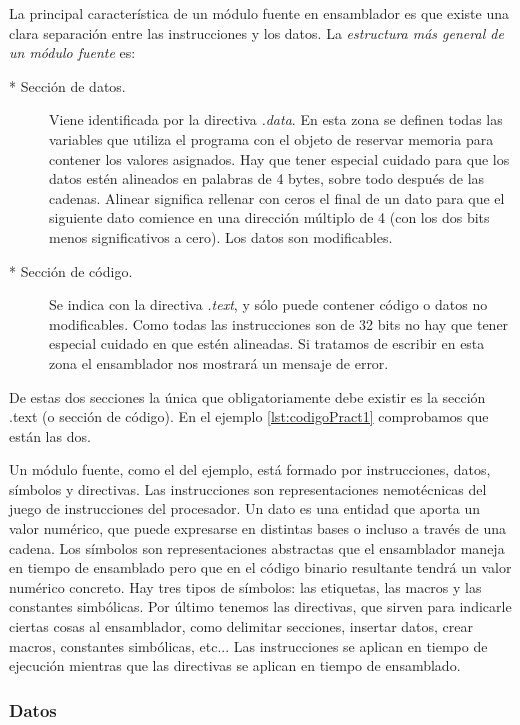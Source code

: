 La principal característica de un módulo fuente en ensamblador es
que existe una clara separación entre las instrucciones y los
datos. La {\it estructura más general de un módulo fuente} es:

\begin{description}
     \item[* Sección de datos.] Viene identificada por la directiva {\it .data}.
En esta zona se definen todas las variables que utiliza el programa
con el objeto de reservar memoria para contener los valores asignados. Hay que
tener especial cuidado para que los datos estén alineados en palabras de 4 bytes,
sobre todo después de las cadenas. Alinear significa rellenar con ceros el final
de un dato para que el siguiente dato comience en una dirección múltiplo de 4 (con
los dos bits menos significativos a cero). Los datos son modificables.

     \item[* Sección de código.] Se indica con la directiva {\it .text}, y sólo
puede contener código o datos no modificables. Como todas las instrucciones son
de 32 bits no hay que tener especial cuidado en que estén alineadas. Si tratamos
de escribir en esta zona el ensamblador nos mostrará un mensaje de error.
\end{description}

De estas dos secciones la única que obligatoriamente debe existir es
la sección .text (o sección de código). En el ejemplo \ref{lst:codigoPract1}
comprobamos que están las dos.

Un módulo fuente, como el del ejemplo, está formado por instrucciones,
datos, símbolos y directivas. 
Las instrucciones son representaciones nemotécnicas del juego
de instrucciones del procesador. Un dato es una entidad que aporta un valor
numérico, que puede expresarse en distintas bases o incluso a través de una cadena.
Los símbolos son representaciones abstractas que el ensamblador maneja en tiempo
de ensamblado pero que en el código binario resultante tendrá un valor numérico
concreto. Hay tres tipos de símbolos: las etiquetas, las macros y las constantes simbólicas.
Por último tenemos las directivas, que sirven para indicarle ciertas cosas al
ensamblador, como delimitar secciones, insertar datos, crear macros, constantes
simbólicas, etc... Las instrucciones se aplican en tiempo de ejecución
mientras que las directivas se aplican en tiempo de ensamblado.

\subsubsection{Datos}

